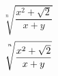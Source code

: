 \documentclass[nofonts]{ctexart}
\begin{document}
\[
	\sqrt[n]{\frac{x^2 + \sqrt{2}}{x+y}}
\]
\[
	\sqrt[\uproot{16}\leftroot{-2}n]{\frac{x^2 + \sqrt{2}}{x+y}}
\]
\end{document}
